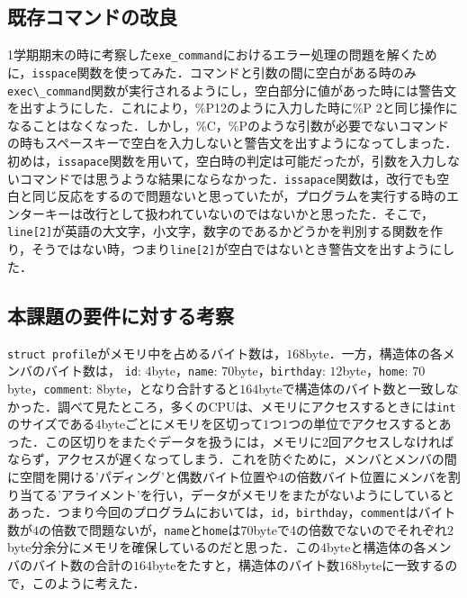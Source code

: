 \documentclass[a4j,11pt]{jarticle}
\begin{document}
\subsection{既存コマンドの改良}
1学期期末の時に考察した\verb|exe_command|におけるエラー処理の問題を解くために，\verb|isspace|関数を使ってみた．コマンドと引数の間に空白がある時のみ\verb|exec\_command|関数が実行されるようにし，空白部分に値があった時には警告文を出すようにした．これにより，\%P12のように入力した時に\%P 2と同じ操作になることはなくなった．しかし，\%C，\%Pのような引数が必要でないコマンドの時もスペースキーで空白を入力しないと警告文を出すようになってしまった．初めは，\verb|issapace|関数を用いて，空白時の判定は可能だったが，引数を入力しないコマンドでは思うような結果にならなかった．\verb|issapace|関数は，改行でも空白と同じ反応をするので問題ないと思っていたが，プログラムを実行する時のエンターキーは改行として扱われていないのではないかと思ったた．そこで，\verb|line[2]|が英語の大文字，小文字，数字のであるかどうかを判別する関数を作り，そうではない時，つまり\verb|line[2]|が空白ではないとき警告文を出すようにした．

\subsection{本課題の要件に対する考察}
\verb|struct profile|がメモリ中を占めるバイト数は，$168$byte．一方，構造体の各メンバのバイト数は，
\verb|id|: $4$byte，\verb|name|: $70$byte，\verb|birthday|: $12$byte，\verb|home|: $70$byte，\verb|comment|: $8$byte，となり合計すると$164$byteで構造体のバイト数と一致しなかった．調べて見たところ，多くのCPUは、メモリにアクセスするときには\verb|int|のサイズである$4$byteごとにメモリを区切って$1$つ$1$つの単位でアクセスするとあった．この区切りをまたぐデータを扱うには，メモリに$2$回アクセスしなければならず，アクセスが遅くなってしまう．これを防ぐために，メンバとメンバの間に空間を開ける’パディング’と偶数バイト位置や$4$の倍数バイト位置にメンバを割り当てる’アライメント’を行い，データがメモリをまたがないようにしているとあった．つまり今回のプログラムにおいては，\verb|id|，\verb|birthday|，\verb|comment|はバイト数が$4$の倍数で問題ないが，\verb|name|と\verb|home|は$70$byteで4の倍数でないのでそれぞれ$2$byte分余分にメモリを確保しているのだと思った．この$4$byteと構造体の各メンバのバイト数の合計の$164$byteをたすと，構造体のバイト数$168$byteに一致するので，このように考えた．


\end{document}
